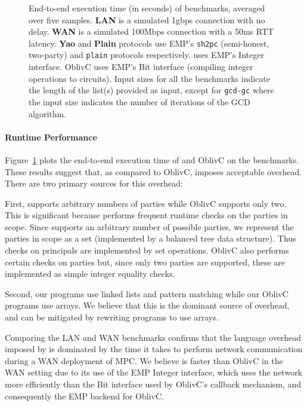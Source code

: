 \begin{figure}
\caption{%
  End-to-end execution time (in seconds) of benchmarks, averaged over five samples.
  \textbf{LAN} is a simulated 1gbps connection with no delay. \textbf{WAN} is a simulated 100Mbps
  connection with a 50ms RTT latency. \textbf{Yao} and \textbf{Plain} protocols use EMP's \texttt{sh2pc}
  (semi-honest, two-party) and \texttt{plain} protocols respectively. \system{} uses EMP's Integer
  interface. OblivC uses EMP's Bit interface (compiling integer operations to circuits).
  Input sizes for all the benchmarks indicate the
  length of the list(s) provided as input, except for \texttt{gcd-gc} where the input size indicates
  the number of iterations of the GCD algorithm.
}\label{fig:mpc-impl-eval-etoe}
\end{figure}

\paragraph{Runtime Performance}

Figure~\ref{fig:mpc-impl-eval-etoe} plots the end-to-end execution time of \system{}
and OblivC on the benchmarks. These results suggest that, as compared to OblivC,
\system imposes acceptable overhead. There are two primary sources for this overhead:

First, \system supports arbitrary numbers of parties while OblivC supports only two.
      This is significant because \system performs frequent runtime checks on the parties in scope.
      Since \system supports an arbitrary number of possible parties, we
      represent the parties in scope as a set (implemented by a balanced tree
      data structure).
      Thus checks on principals are implemented by set operations.
      OblivC also performs certain checks on parties but, since only two
      parties are supported, these are implemented as simple integer equality
      checks.

Second, our \system programs use linked lists and pattern matching while our
OblivC programs use arrays.  We believe that this is the dominant source of
overhead, and can be mitigated by rewriting \system programs to use arrays.

Comparing the LAN and WAN benchmarks confirms that the language overhead imposed by \system{} is dominated by
the time it takes to perform network communication during a WAN deployment of MPC. We believe \system{} is faster than OblivC in the WAN setting
due to its use of the EMP Integer interface, which uses the network
more efficiently than the Bit interface used by OblivC's callback
mechanism, and consequently the EMP backend for OblivC.

